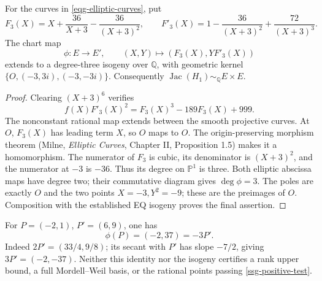 \begin{theorem}\label{ssg-isogeny}
For the curves in \eqref{eqg-elliptic-curves}, put
\[
 F_3(X)=X+\frac{36}{X+3}-\frac{36}{(X+3)^2},\qquad
 F'_3(X)=1-\frac{36}{(X+3)^2}+\frac{72}{(X+3)^3}.
\]
The chart map
\begin{equation}\label{ssg-isogeny-map}
 \phi:E\longrightarrow E',\qquad
 (X,Y)\longmapsto(F_3(X),YF'_3(X))
\end{equation}
extends to a degree-three isogeny over \(\mathbb Q\), with geometric
kernel \(\{O,(-3,3i),(-3,-3i)\}\). Consequently
\(\operatorname{Jac}(H_1)\sim_{\mathbb Q}E\times E\).
\end{theorem}
\begin{proof}
Clearing \((X+3)^6\) verifies
\begin{equation}\label{ssg-isogeny-identity}
 f(X)F'_3(X)^2=F_3(X)^3-189F_3(X)+999.
\end{equation}
The nonconstant rational map extends between the smooth projective
curves. At \(O\), \(F_3(X)\) has leading term \(X\), so \(O\)
maps to \(O\). The origin-preserving morphism theorem
(Milne, \emph{Elliptic Curves}, Chapter II, Proposition 1.5)
makes it a homomorphism.
The numerator of \(F_3\) is cubic, its denominator is \((X+3)^2\),
and the numerator at \(-3\) is \(-36\). Thus its degree on
\(\mathbb P^1\) is three. Both elliptic abscissa maps have degree
two; their commutative diagram gives \(\deg\phi=3\).
The poles are exactly \(O\) and the two points \(X=-3,Y^2=-9\);
these are the preimages of \(O\).
Composition with the established EQ isogeny proves the final assertion.
\end{proof}
For \(P=(-2,1)\), \(P'=(6,9)\), one has
\[
 \phi(P)=(-2,37)=-3P'.
\]
Indeed \(2P'=(33/4,9/8)\); its secant with \(P'\) has slope
\(-7/2\), giving \(3P'=(-2,-37)\).
Neither this identity nor the isogeny certifies a rank upper bound,
a full Mordell--Weil basis, or the rational points passing
\eqref{ssg-positive-test}.

